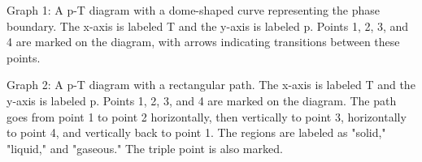 Graph 1: A p-T diagram with a dome-shaped curve representing the phase boundary. The x-axis is labeled T and the y-axis is labeled p. Points 1, 2, 3, and 4 are marked on the diagram, with arrows indicating transitions between these points.

Graph 2: A p-T diagram with a rectangular path. The x-axis is labeled T and the y-axis is labeled p. Points 1, 2, 3, and 4 are marked on the diagram. The path goes from point 1 to point 2 horizontally, then vertically to point 3, horizontally to point 4, and vertically back to point 1. The regions are labeled as "solid," "liquid," and "gaseous." The triple point is also marked.